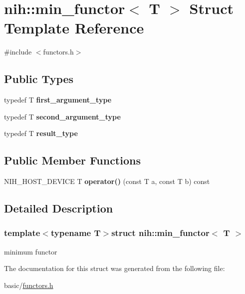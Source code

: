 \hypertarget{structnih_1_1min__functor}{
\section{nih\-:\-:min\-\_\-functor$<$ \-T $>$ \-Struct \-Template \-Reference}
\label{structnih_1_1min__functor}
}


{\ttfamily \#include $<$functors.\-h$>$}

\subsection*{\-Public \-Types}
\begin{DoxyCompactItemize}
\item 
\hypertarget{structnih_1_1min__functor_a2f365fa19cb299f99ecad0124fc5b501}{
typedef \-T {\bfseries first\-\_\-argument\-\_\-type}}
\label{structnih_1_1min__functor_a2f365fa19cb299f99ecad0124fc5b501}

\item 
\hypertarget{structnih_1_1min__functor_aa107bf1a2da2057cf7bdf2d1ce869a1c}{
typedef \-T {\bfseries second\-\_\-argument\-\_\-type}}
\label{structnih_1_1min__functor_aa107bf1a2da2057cf7bdf2d1ce869a1c}

\item 
\hypertarget{structnih_1_1min__functor_aef38714e1f2aa83e4eeb5bbea98a1163}{
typedef \-T {\bfseries result\-\_\-type}}
\label{structnih_1_1min__functor_aef38714e1f2aa83e4eeb5bbea98a1163}

\end{DoxyCompactItemize}
\subsection*{\-Public \-Member \-Functions}
\begin{DoxyCompactItemize}
\item 
\hypertarget{structnih_1_1min__functor_acf7486fd39195f1bc88a8e368aebf45e}{
\-N\-I\-H\-\_\-\-H\-O\-S\-T\-\_\-\-D\-E\-V\-I\-C\-E \-T {\bfseries operator()} (const \-T a, const \-T b) const }
\label{structnih_1_1min__functor_acf7486fd39195f1bc88a8e368aebf45e}

\end{DoxyCompactItemize}


\subsection{\-Detailed \-Description}
\subsubsection*{template$<$typename T$>$struct nih\-::min\-\_\-functor$<$ T $>$}

minimum functor 

\-The documentation for this struct was generated from the following file\-:\begin{DoxyCompactItemize}
\item 
basic/\hyperlink{functors_8h}{functors.\-h}\end{DoxyCompactItemize}
